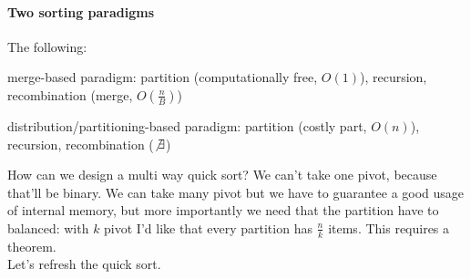 \documentclass[10pt]{report}
\begin{document}
\paragraph{Two sorting paradigms} The following:
\begin{list}{}{}
	\item merge-based paradigm: partition (computationally free, $O(1)$), recursion, recombination (merge, $O(\frac{n}{B})$)
	\item distribution/partitioning-based paradigm: partition (costly part, $O(n)$), recursion, recombination ($\not\exists$)
\end{list}
How can we design a multi way quick sort? We can't take one pivot, because that'll be binary. We can take many pivot but we have to guarantee a good usage of internal memory, but more importantly we need that the partition have to balanced: with $k$ pivot I'd like that every partition has $\frac{n}{k}$ items. This requires a theorem.\\
Let's refresh the quick sort. %
\end{document}
